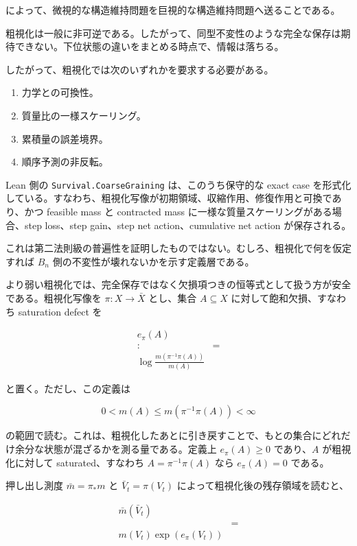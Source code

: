\documentclass[12pt,a4paper]{article}
\begin{document}
によって、微視的な構造維持問題を巨視的な構造維持問題へ送ることである。

粗視化は一般に非可逆である。したがって、同型不変性のような完全な保存は期待できない。下位状態の違いをまとめる時点で、情報は落ちる。

したがって、粗視化では次のいずれかを要求する必要がある。

\begin{enumerate}
\def\labelenumi{\arabic{enumi}.}
\tightlist
\item
  力学との可換性。
\item
  質量比の一様スケーリング。
\item
  累積量の誤差境界。
\item
  順序予測の非反転。
\end{enumerate}

Lean 側の \texttt{Survival.CoarseGraining} は、このうち保守的な exact case を形式化している。すなわち、粗視化写像が初期領域、収縮作用、修復作用と可換であり、かつ feasible mass と contracted mass に一様な質量スケーリングがある場合、step loss、step gain、step net action、cumulative net action が保存される。

これは第二法則級の普遍性を証明したものではない。むしろ、粗視化で何を仮定すれば \(B_{n}\) 側の不変性が壊れないかを示す定義層である。

より弱い粗視化では、完全保存ではなく欠損項つきの恒等式として扱う方が安全である。粗視化写像を \(\pi:X\to\bar X\) とし、集合 \(A\subseteq X\) に対して飽和欠損、すなわち saturation defect を

\[
\begin{aligned}
e_\pi(A) \\
:&= \\
\log\frac{m(\pi^{-1}\pi(A))}{m(A)}
\end{aligned}
\]

と置く。ただし、この定義は

\[
0<m(A)\le m(\pi^{-1}\pi(A))<\infty
\]

の範囲で読む。これは、粗視化したあとに引き戻すことで、もとの集合にどれだけ余分な状態が混ざるかを測る量である。定義上 \(e_\pi(A)\ge 0\) であり、\(A\) が粗視化に対して saturated、すなわち \(A=\pi^{-1}\pi(A)\) なら \(e_\pi(A)=0\) である。

押し出し測度 \(\bar m=\pi_*m\) と \(\bar V_{t}=\pi(V_{t})\) によって粗視化後の残存領域を読むと、

\[
\begin{aligned}
\bar m(\bar V_{t}) \\
&= \\
m(V_{t})\exp(e_\pi(V_{t}))
\end{aligned}
\]
\end{document}
